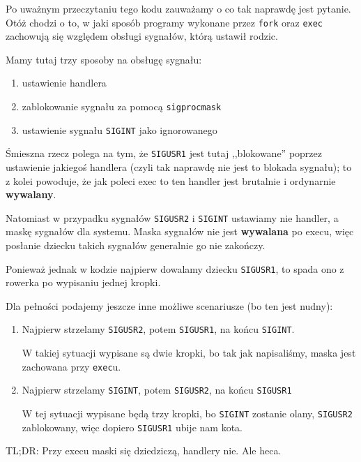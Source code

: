 Po uważnym przeczytaniu tego kodu zauważamy o co tak naprawdę jest pytanie.
Otóż chodzi o to, w jaki sposób programy wykonane przez \texttt{fork} oraz \texttt{exec} zachowują się względem obsługi sygnałów, którą ustawił rodzic.

Mamy tutaj trzy sposoby na obsługę sygnału:
\begin{enumerate}
	\item ustawienie handlera
	\item zablokowanie sygnału za pomocą \texttt{sigprocmask}
	\item ustawienie sygnału \texttt{SIGINT} jako ignorowanego
\end{enumerate}

Śmieszna rzecz polega na tym, że \texttt{SIGUSR1} jest tutaj ,,blokowane'' poprzez ustawienie jakiegoś handlera (czyli tak naprawdę nie jest to blokada sygnału); to z kolei powoduje, że jak poleci exec to ten handler jest brutalnie i ordynarnie \textbf{wywalany}.

Natomiast w przypadku sygnałów \texttt{SIGUSR2} i \texttt{SIGINT} ustawiamy nie handler, a maskę sygnałów dla systemu. Maska sygnałów nie jest \textbf{wywalana} po execu, więc posłanie dziecku takich sygnałów generalnie go nie zakończy.

Ponieważ jednak w kodzie najpierw dowalamy dziecku \texttt{SIGUSR1}, to spada ono z rowerka po wypisaniu jednej kropki.

Dla pełności podajemy jeszcze inne możliwe scenariusze (bo ten jest nudny):
\begin{enumerate}
	\item Najpierw strzelamy \texttt{SIGUSR2}, potem \texttt{SIGUSR1}, na końcu \texttt{SIGINT}.

	      W takiej sytuacji wypisane są dwie kropki, bo tak jak napisaliśmy, maska jest zachowana przy \texttt{exec}u.

	\item Najpierw strzelamy \texttt{SIGINT}, potem \texttt{SIGUSR2}, na końcu \texttt{SIGUSR1}

	      W tej sytuacji wypisane będą trzy kropki, bo \texttt{SIGINT} zostanie olany, \texttt{SIGUSR2} zablokowany, więc dopiero \texttt{SIGUSR1} ubije nam kota.
\end{enumerate}

TL;DR: Przy execu maski się dziedziczą, handlery nie. Ale heca.